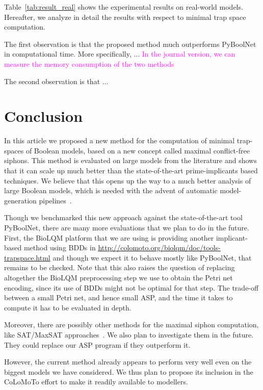 \documentclass[runningheads]{llncs}
\newcommand{\vangiang}[1]{\textcolor{magenta}{#1}}
\begin{document}
Table~\ref{tab:result_real} shows the experimental results on real-world models. Hereafter, we analyze in detail the results with respect to minimal trap space computation.

The first observation is that the proposed method much outperforms PyBoolNet in computational time. More specifically, ...
\vangiang{In the journal version, we can measure the memory consumption of the two methods}

The second observation is that ...

\section{Conclusion}

In this article we proposed a new method for the computation of minimal trap-spaces of Boolean models, based on a new concept called maximal conflict-free siphons.
This method is evaluated on large models from the literature and shows that it can scale up much better than the state-of-the-art prime-implicants based techniques.
We believe that this opens up the way to a much better analysis of large Boolean models, which is needed with the advent of automatic model-generation pipelines~\cite{ostaszewski2021covid19}.

Though we benchmarked this new approach against the state-of-the-art tool PyBoolNet, there are many more evaluations that we plan to do in the future.
First, the BioLQM platform that we are using is providing another implicant-based method using BDDs in \url{http://colomoto.org/biolqm/doc/tools-trapspace.html} and though we expect it to behave mostly like PyBoolNet, that remains to be checked.
Note that this also raises the question of replacing altogether the BioLQM preprocessing step we use to obtain the Petri net encoding, since its use of BDDs might not be optimal for that step.
The trade-off between a small Petri net, and hence small ASP, and the time it takes to compute it has to be evaluated in depth.

Moreover, there are possibly other methods for the maximal siphon computation, like SAT/MaxSAT approaches~\cite{nabli2016enumerating}. We also plan to investigate them in the future. They could replace our ASP program if they outperform it.

However, the current method already appears to perform very well even on the biggest models we have considered.
We thus plan to propose its inclusion in the CoLoMoTo effort to make it readily available to modellers.




\end{document}
